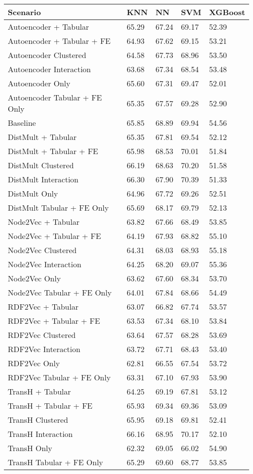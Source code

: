 \begin{tabular}{lllll}
\toprule
Scenario & KNN & NN & SVM & XGBoost \\
\midrule
Autoencoder + Tabular & 65.29 & 67.24 & 69.17 & 52.39 \\
Autoencoder + Tabular + FE & 64.93 & 67.62 & 69.15 & 53.21 \\
Autoencoder Clustered & 64.58 & 67.73 & 68.96 & 53.50 \\
Autoencoder Interaction & 63.68 & 67.34 & 68.54 & 53.48 \\
Autoencoder Only & 65.60 & 67.31 & 69.47 & 52.01 \\
Autoencoder Tabular + FE Only & 65.35 & 67.57 & 69.28 & 52.90 \\
Baseline & 65.85 & 68.89 & 69.94 & 54.56 \\
DistMult + Tabular & 65.35 & 67.81 & 69.54 & 52.12 \\
DistMult + Tabular + FE & 65.98 & 68.53 & 70.01 & 51.84 \\
DistMult Clustered & 66.19 & 68.63 & 70.20 & 51.58 \\
DistMult Interaction & 66.30 & 67.90 & 70.39 & 51.33 \\
DistMult Only & 64.96 & 67.72 & 69.26 & 52.51 \\
DistMult Tabular + FE Only & 65.69 & 68.17 & 69.79 & 52.13 \\
Node2Vec + Tabular & 63.82 & 67.66 & 68.49 & 53.85 \\
Node2Vec + Tabular + FE & 64.19 & 67.93 & 68.82 & 55.10 \\
Node2Vec Clustered & 64.31 & 68.03 & 68.93 & 55.18 \\
Node2Vec Interaction & 64.25 & 68.20 & 69.07 & 55.36 \\
Node2Vec Only & 63.62 & 67.60 & 68.34 & 53.70 \\
Node2Vec Tabular + FE Only & 64.01 & 67.84 & 68.66 & 54.49 \\
RDF2Vec + Tabular & 63.07 & 66.82 & 67.74 & 53.57 \\
RDF2Vec + Tabular + FE & 63.53 & 67.34 & 68.10 & 53.84 \\
RDF2Vec Clustered & 63.64 & 67.57 & 68.28 & 53.69 \\
RDF2Vec Interaction & 63.72 & 67.71 & 68.43 & 53.40 \\
RDF2Vec Only & 62.81 & 66.55 & 67.54 & 53.72 \\
RDF2Vec Tabular + FE Only & 63.31 & 67.10 & 67.93 & 53.90 \\
TransH + Tabular & 64.25 & 69.19 & 67.81 & 53.12 \\
TransH + Tabular + FE & 65.93 & 69.34 & 69.36 & 53.09 \\
TransH Clustered & 65.95 & 69.18 & 69.81 & 52.41 \\
TransH Interaction & 66.16 & 68.95 & 70.17 & 52.10 \\
TransH Only & 62.32 & 69.05 & 66.02 & 54.90 \\
TransH Tabular + FE Only & 65.29 & 69.60 & 68.77 & 53.85 \\
\bottomrule
\end{tabular}
